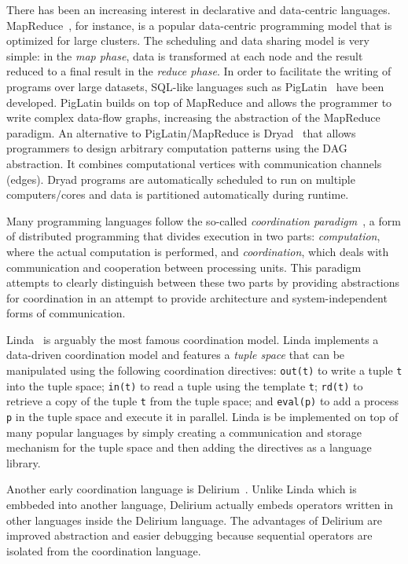 There has been an increasing interest in declarative and data-centric
languages. MapReduce~\cite{Dean:2008:MSD:1327452.1327492}, for instance, is a
popular data-centric programming model that is optimized for large clusters. The
scheduling and data sharing model is very simple: in the \emph{map phase}, data
is transformed at each node and the result reduced to a final result in the
\emph{reduce phase}. In order to facilitate the writing of programs over large
datasets, SQL-like languages such as
PigLatin~\cite{Olston:2008:PLN:1376616.1376726} have been developed.
PigLatin builds on top of MapReduce and allows the programmer to write complex
data-flow graphs, increasing the abstraction of the MapReduce paradigm.
An alternative to PigLatin/MapReduce is
Dryad~\cite{Isard:2007:DDD:1272996.1273005}
that allows programmers to design arbitrary computation patterns using the DAG
abstraction. It combines computational vertices with communication channels
(edges). Dryad programs are automatically scheduled to run on multiple
computers/cores and data is partitioned automatically during runtime.

Many programming languages follow the so-called \emph{coordination
paradigm}~\cite{Papadopoulos98coordinationmodels}, a form of distributed
programming that divides execution in two parts: \emph{computation}, where the actual
computation is performed, and \emph{coordination}, which deals with
communication and cooperation between processing units. This paradigm attempts
to clearly distinguish between these two parts by providing abstractions for
coordination in an attempt to provide architecture and system-independent forms
of communication.  

Linda~\cite{linda} is arguably the most famous coordination model. Linda
implements a data-driven coordination model and features a \emph{tuple space}
that can be manipulated using the following coordination directives:
\texttt{out(t)} to write a tuple \texttt{t} into the tuple space; \texttt{in(t)}
to read a tuple using the template \texttt{t}; \texttt{rd(t)} to retrieve a copy of
the tuple \texttt{t} from the tuple space; and \texttt{eval(p)} to add a process
\texttt{p} in the tuple space and execute it in parallel. 
Linda is be implemented on top of many
popular languages by simply creating a communication and storage mechanism for
the tuple space and then adding the directives as a language library.

Another early coordination language is Delirium~\cite{Delirium}. Unlike
Linda which is embbeded into another language, Delirium actually embeds
operators written in other languages inside the Delirium language.
The advantages of Delirium are improved abstraction
and easier debugging because sequential operators are isolated from the
coordination language.


